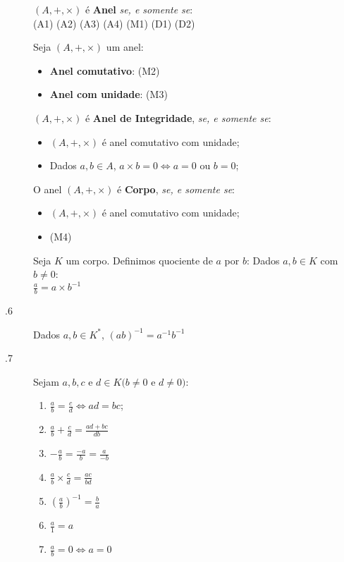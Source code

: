 \documentclass[11pt]{article}
\begin{document}
\begin{description}
  \item[] $(A, +, \times)$ é \textbf{Anel} \emph{se, e somente se}: \\
    (A1) (A2) (A3) (A4) (M1) (D1) (D2)
  \item[] Seja $(A, +, \times)$ um anel:
    \begin{itemize}
      \item \textbf{Anel comutativo}: (M2)
      \item \textbf{Anel com unidade}: (M3)
    \end{itemize}
  \item[] $(A, +, \times)$ é \textbf{Anel de Integridade}, \emph{se, e
    somente se}:
    \begin{itemize}
      \item $(A, +, \times)$ é anel comutativo com unidade;
      \item Dados $a, b \in A$, $a \times b = 0 \iff a = 0$ ou $b = 0$;
    \end{itemize}
  \item[] O anel $(A, +, \times)$ é \textbf{Corpo}, \emph{se, e somente
    se}:
    \begin{itemize}
      \item $(A, +, \times)$ é anel comutativo com unidade;
      \item (M4)
    \end{itemize}
  \item[] Seja $K$ um corpo. Definimos quociente de $a$ por $b$: Dados $a, b
    \in K$ com $b \neq 0$: \\
    $\frac{a}{b} = a \times b^{-1}$
  \item[.6] Dados $a, b \in K^*$, $(ab)^{-1} = a^{-1} b^{-1}$
  \item[.7] Sejam $a, b, c$ e $d \in K (b \neq 0$ e $d \neq 0)$:
    \begin{multicols}{3}
      \begin{enumerate}
        \item $\frac{a}{b} = \frac{c}{d} \iff ad=bc$;
        \item $\frac{a}{b} + \frac{c}{d} = \frac{ad + bc}{db}$
        \item $-\frac{a}{b} = \frac{-a}{b} = \frac{a}{-b}$
        \item $\frac{a}{b}\times \frac{c}{d} = \frac{ac}{bd}$
        \item $(\frac{a}{b})^{-1} = \frac{b}{a}$
        \item $\frac{a}{1} = a$
        \item $\frac{a}{b} = 0 \iff a = 0$
      \end{enumerate}
    \end{multicols}
\end{description}
\end{document}
